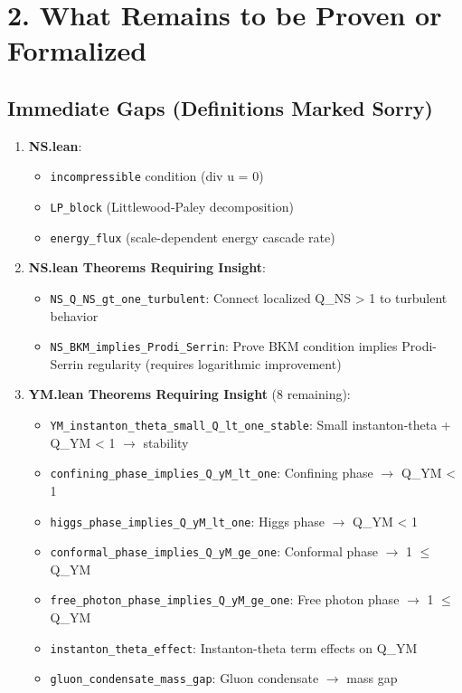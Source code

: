 \documentclass[11pt]{article}
\begin{document}
\section{2. What Remains to be Proven or Formalized}

\subsection{Immediate Gaps (Definitions Marked Sorry)}
\begin{enumerate}
\item \textbf{NS.lean}:
  \begin{itemize}
  \item \texttt{incompressible} condition (div u = 0)
  \item \texttt{LP\_block} (Littlewood-Paley decomposition)
  \item \texttt{energy\_flux} (scale-dependent energy cascade rate)
  \end{itemize}
\item \textbf{NS.lean Theorems Requiring Insight}:
  \begin{itemize}
  \item \texttt{NS\_Q\_NS\_gt\_one\_turbulent}: Connect localized Q\_NS > 1 to turbulent behavior
  \item \texttt{NS\_BKM\_implies\_Prodi\_Serrin}: Prove BKM condition implies Prodi-Serrin regularity (requires logarithmic improvement)
  \end{itemize}
\item \textbf{YM.lean Theorems Requiring Insight} (8 remaining):
  \begin{itemize}
  \item \texttt{YM\_instanton\_theta\_small\_Q\_lt\_one\_stable}: Small instanton-theta + Q\_YM < 1 $\rightarrow$ stability
  \item \texttt{confining\_phase\_implies\_Q\_yM\_lt\_one}: Confining phase $\rightarrow$ Q\_YM < 1
  \item \texttt{higgs\_phase\_implies\_Q\_yM\_lt\_one}: Higgs phase $\rightarrow$ Q\_YM < 1
  \item \texttt{conformal\_phase\_implies\_Q\_yM\_ge\_one}: Conformal phase $\rightarrow$ 1 $\leq$ Q\_YM
  \item \texttt{free\_photon\_phase\_implies\_Q\_yM\_ge\_one}: Free photon phase $\rightarrow$ 1 $\leq$ Q\_YM
  \item \texttt{instanton\_theta\_effect}: Instanton-theta term effects on Q\_YM
  \item \texttt{gluon\_condensate\_mass\_gap}: Gluon condensate $\rightarrow$ mass gap

\end{itemize}
\end{enumerate}
\end{document}
